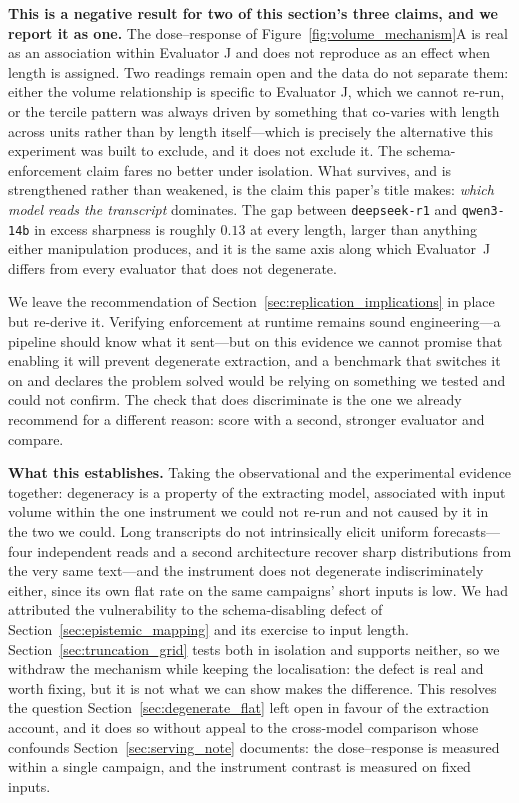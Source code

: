 \documentclass[11pt,journal,onecolumn]{IEEEtran}
\begin{document}
\textbf{This is a negative result for two of this section's three claims, and we report it as one.} The dose--response of Figure~\ref{fig:volume_mechanism}A is real as an association within Evaluator J and does not reproduce as an effect when length is assigned. Two readings remain open and the data do not separate them: either the volume relationship is specific to Evaluator J, which we cannot re-run, or the tercile pattern was always driven by something that co-varies with length across units rather than by length itself---which is precisely the alternative this experiment was built to exclude, and it does not exclude it. The schema-enforcement claim fares no better under isolation. What survives, and is strengthened rather than weakened, is the claim this paper's title makes: \emph{which model reads the transcript} dominates. The gap between \texttt{deepseek-r1} and \texttt{qwen3-14b} in excess sharpness is roughly $0.13$ at every length, larger than anything either manipulation produces, and it is the same axis along which Evaluator~J differs from every evaluator that does not degenerate.

We leave the recommendation of Section~\ref{sec:replication_implications} in place but re-derive it. Verifying enforcement at runtime remains sound engineering---a pipeline should know what it sent---but on this evidence we cannot promise that enabling it will prevent degenerate extraction, and a benchmark that switches it on and declares the problem solved would be relying on something we tested and could not confirm. The check that does discriminate is the one we already recommend for a different reason: score with a second, stronger evaluator and compare.

\textbf{What this establishes.} Taking the observational and the experimental evidence together: degeneracy is a property of the extracting model, associated with input volume within the one instrument we could not re-run and not caused by it in the two we could. Long transcripts do not intrinsically elicit uniform forecasts---four independent reads and a second architecture recover sharp distributions from the very same text---and the instrument does not degenerate indiscriminately either, since its own flat rate on the same campaigns' short inputs is low. We had attributed the vulnerability to the schema-disabling defect of Section~\ref{sec:epistemic_mapping} and its exercise to input length. Section~\ref{sec:truncation_grid} tests both in isolation and supports neither, so we withdraw the mechanism while keeping the localisation: the defect is real and worth fixing, but it is not what we can show makes the difference. This resolves the question Section~\ref{sec:degenerate_flat} left open in favour of the extraction account, and it does so without appeal to the cross-model comparison whose confounds Section~\ref{sec:serving_note} documents: the dose--response is measured within a single campaign, and the instrument contrast is measured on fixed inputs.
\end{document}
